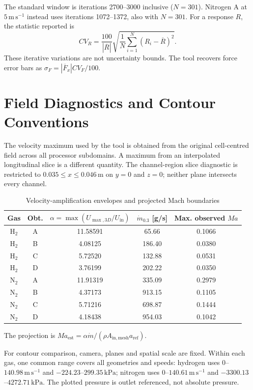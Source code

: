 The standard window is iterations 2700--3000 inclusive ($N=301$). Nitrogen A at $5\,\mathrm{m\,s^{-1}}$ instead uses iterations 1072--1372, also with $N=301$. For a response $R$, the statistic reported is
\[
CV_R=\frac{100}{|\overline R|}
\sqrt{\frac{1}{N}\sum_{i=1}^{N}(R_i-\overline R)^2}.
\]
These iterative variations are not uncertainty bounds. The tool recovers force error bars as $\sigma_F=|\overline F_x|CV_F/100$.

\clearpage
\section{Field Diagnostics and Contour Conventions}
\label{sec:app_field_diagnostics}

The velocity maximum used by the tool is obtained from the original cell-centred field across all processor subdomains. A maximum from an interpolated longitudinal slice is a different quantity. The channel-region slice diagnostic is restricted to $0.035\leq x\leq0.046\,\mathrm{m}$ on $y=0$ and $z=0$; neither plane intersects every channel.

\begin{table}[H]
\centering\small
\begin{tabular}{@{}ccccc@{}}
\toprule
Gas & Obt. & $\alpha=\max(U_{\max,3D}/U_{\mathrm{in}})$ & $\dot m_{0.3}$ [g/s] & Max. observed $Ma$\\
\midrule
$\mathrm{H}_2$ & A & 11.58591 & 65.66 & 0.1066\\
$\mathrm{H}_2$ & B & 4.08125 & 186.40 & 0.0380\\
$\mathrm{H}_2$ & C & 5.72520 & 132.88 & 0.0531\\
$\mathrm{H}_2$ & D & 3.76199 & 202.22 & 0.0350\\
\midrule
$\mathrm{N}_2$ & A & 11.91319 & 335.09 & 0.2979\\
$\mathrm{N}_2$ & B & 4.37173 & 913.15 & 0.1105\\
$\mathrm{N}_2$ & C & 5.71216 & 698.87 & 0.1444\\
$\mathrm{N}_2$ & D & 4.18438 & 954.03 & 0.1042\\
\bottomrule
\end{tabular}
\caption{Velocity-amplification envelopes and projected Mach boundaries}
\label{tab:app_mach_envelopes}
\end{table}

The projection is $Ma_{\mathrm{est}}=\alpha\dot m/(\rho A_{\mathrm{in,mesh}}a_{\mathrm{ref}})$.

For contour comparison, camera, planes and spatial scale are fixed. Within each gas, one common range covers all geometries and speeds: hydrogen uses $0$--$140.98\,\mathrm{m\,s^{-1}}$ and $-224.23$--$299.35\,\mathrm{kPa}$; nitrogen uses $0$--$140.61\,\mathrm{m\,s^{-1}}$ and $-3300.13$--$4272.71\,\mathrm{kPa}$.  The plotted pressure is outlet referenced, not absolute pressure.

